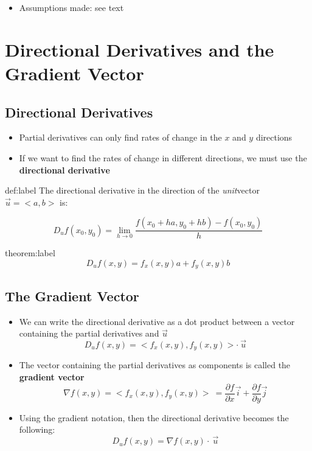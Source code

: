 \documentclass{package/notes}
\begin{document}
\begin{itemize}
	\item Assumptions made: see text 
\end{itemize}



\section{Directional Derivatives and the Gradient Vector}


\subsection{Directional Derivatives}

\begin{itemize}
	\item Partial derivatives can only find rates of change in the $x$ and $y$ directions
	\item If we want to find the rates of change in different directions, we must use the \textbf{directional derivative}
\end{itemize}

\begin{definition}{def:label}
	The directional derivative in the direction of the \textit{unit}vector $\vec u = <a,b>$ is:

	$$D_uf(x_0,y_0)=\lim_{h\to 0}\frac{f(x_0+ha,y_0+hb)-f(x_0,y_0)}{h}$$
\end{definition}

\begin{theorem}{theorem:label}
	$$D_uf(x,y) = f_x(x,y)a+f_y(x,y)b$$
\end{theorem}


\subsection{The Gradient Vector}

\begin{itemize}
	\item We can write the directional derivative as a dot product between a vector containing the partial derivatives and $\vec u$
	$$D_uf(x,y) = <f_x(x,y),f_y(x,y)> \cdot \:\vec u$$
	\item The vector containing the partial derivatives as components is called the \textbf{gradient vector}
	$$\nabla f(x,y) = <f_x(x,y),f_y(x,y)> \: =\frac{\partial f}{\partial x}\vec i+\frac{\partial f}{\partial y}\vec j$$
	\item Using the gradient notation, then the directional derivative becomes the following:
	$$D_uf(x,y) = \nabla f(x,y) \cdot \: \vec u$$
\end{itemize}
\end{document}
